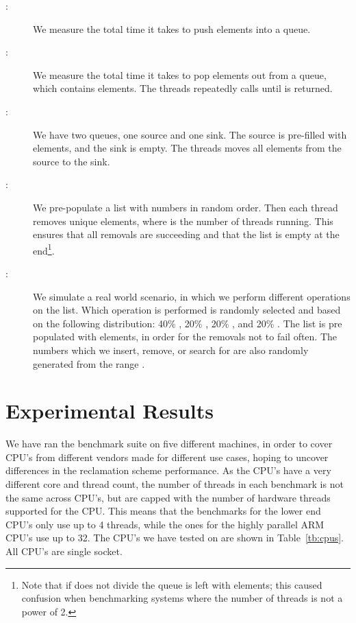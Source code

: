 \documentclass[b5paper]{report}
\begin{document}
\begin{description}
  \item[:] We measure the total time it takes to push 
    elements into a queue.
  \item[:] We measure the total time it takes to pop 
    elements out from a queue, which contains  elements. The threads
    repeatedly calls  until  is returned.
  \item[:] We have two queues, one source and one sink.
    The source is pre-filled with  elements, and the sink is empty. The
    threads moves all elements from the source to the sink.
  \item[:] We pre-populate a list with  numbers in
    random order. Then each thread removes  unique elements, where
     is the number of threads running. This ensures that all removals
    are succeeding and that the list is empty at the end\footnote{Note that if 
    does not divide  the queue is left with  elements; this
    caused confusion when benchmarking systems where the number of threads is
    not a power of 2.}.
  \item[:] We simulate a real world scenario, in which we
    perform different operations on the list. Which operation is performed is
    randomly selected and based on the following distribution: 40\%
    , 20\% , 20\% , and 20\%
    . The list is pre populated with  elements, in order for
    the removals not to fail often. The numbers which we insert, remove, or
    search for are also randomly generated from the range \code{[0, N)}.
\end{description}


\chapter{Experimental Results}\label{ch:results}

We have ran the benchmark suite on five different machines, in order to cover
CPU's from different vendors made for different use cases, hoping to uncover
differences in the reclamation scheme performance. As the CPU's have a very
different core and thread count, the number of threads in each benchmark is not
the same across CPU's, but are capped with the number of hardware threads
supported for the CPU\@. This means that the benchmarks for the lower end CPU's
only use up to 4 threads, while the ones for the highly parallel ARM CPU's use
up to 32. The CPU's we have tested on are shown in Table~\ref{tb:cpus}. All CPU's
are single socket.
\end{document}
